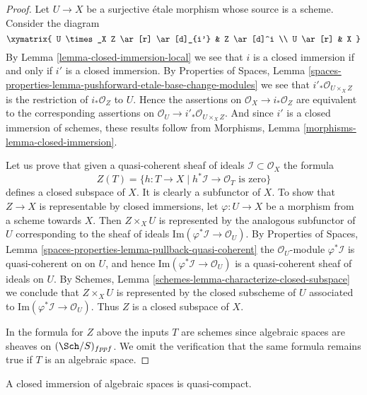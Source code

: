 \begin{proof}
Let $U \to X$ be a surjective \'etale morphism whose source is a scheme.
Consider the diagram
$$
\xymatrix{
U \times_X Z \ar[r] \ar[d]_{i'} & Z \ar[d]^i \\
U \ar[r] & X
}
$$
By
Lemma \ref{lemma-closed-immersion-local}
we see that $i$ is a closed immersion
if and only if $i'$ is a closed immersion. By
Properties of Spaces,
Lemma \ref{spaces-properties-lemma-pushforward-etale-base-change-modules}
we see that $i'_*\mathcal{O}_{U \times_X Z}$ is the restriction of
$i_*\mathcal{O}_Z$ to $U$. Hence the assertions on
$\mathcal{O}_X \to i_*\mathcal{O}_Z$ are equivalent to the
corresponding assertions on
$\mathcal{O}_U \to i'_*\mathcal{O}_{U \times_X Z}$.
And since $i'$ is a closed immersion of schemes, these results follow from
Morphisms, Lemma \ref{morphisms-lemma-closed-immersion}.

\medskip\noindent
Let us prove that given a quasi-coherent
sheaf of ideals $\mathcal{I} \subset \mathcal{O}_X$ the formula
$$
Z(T) = \{h : T \to X \mid h^*\mathcal{I} \to \mathcal{O}_T
\text{ is zero}\}
$$
defines a closed subspace of $X$. It is clearly a subfunctor of $X$.
To show that $Z \to X$ is representable by closed immersions, let
$\varphi : U \to X$ be a morphism from a scheme towards $X$. Then
$Z \times_X U$ is represented by the analogous subfunctor of $U$ corresponding
to the sheaf of ideals $\text{Im}(\varphi^*\mathcal{I} \to \mathcal{O}_U)$. By
Properties of Spaces,
Lemma \ref{spaces-properties-lemma-pullback-quasi-coherent}
the $\mathcal{O}_U$-module $\varphi^*\mathcal{I}$ is quasi-coherent on
on $U$, and hence $\text{Im}(\varphi^*\mathcal{I} \to \mathcal{O}_U)$
is a quasi-coherent sheaf of ideals on $U$. By
Schemes, Lemma \ref{schemes-lemma-characterize-closed-subspace}
we conclude that $Z \times_X U$ is represented by the closed subscheme
of $U$ associated to $\text{Im}(\varphi^*\mathcal{I} \to \mathcal{O}_U)$.
Thus $Z$ is a closed subspace of $X$.

\medskip\noindent
In the formula for $Z$ above the inputs $T$ are schemes since algebraic
spaces are sheaves on $(\Sch/S)_{fppf}$. We omit the verification
that the same formula remains true if $T$ is an algebraic space.
\end{proof}

\begin{lemma}
\label{lemma-closed-immersion-quasi-compact}
A closed immersion of algebraic spaces is quasi-compact.
\end{lemma}

